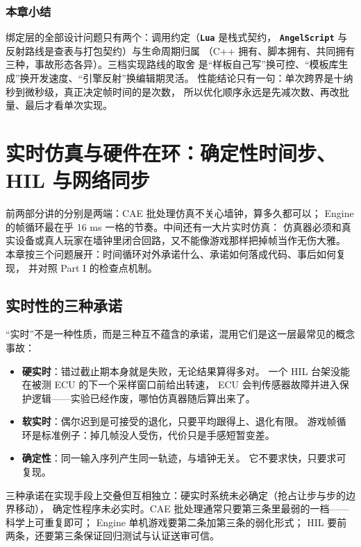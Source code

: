 \documentclass[12pt,a4paper,fontset=fandol]{ctexbook}
\newcommand{\Lib}[1]{\textbf{\texttt{#1}}}
\newcommand{\Lang}[1]{\textsf{#1}}
\newcommand{\DomCAE}{\Lang{CAE}}
\newcommand{\DomEngine}{\Lang{Engine}}
\begin{document}
\subsection*{本章小结}
绑定层的全部设计问题只有两个：调用约定（\Lib{Lua} 是栈式契约，
\Lib{AngelScript} 与反射路线是查表与打包契约）与生命周期归属
（C++ 拥有、脚本拥有、共同拥有三种，事故形态各异）。三档实现路线的取舍
是``样板自己写''换可控、``模板库生成''换开发速度、``引擎反射''换编辑期灵活。
性能结论只有一句：单次跨界是十纳秒到微秒级，真正决定帧时间的是次数，
所以优化顺序永远是先减次数、再改批量、最后才看单次实现。

\chapter{实时仿真与硬件在环：确定性时间步、HIL 与网络同步}
\label{ch:ch15-hil}

前两部分讲的分别是两端：\DomCAE{} 批处理仿真不关心墙钟，算多久都可以；
\DomEngine{} 的帧循环最在乎 16 ms 一格的节奏。中间还有一大片实时仿真：
仿真器必须和真实设备或真人玩家在墙钟里闭合回路，又不能像游戏那样把掉帧当作无伤大雅。
本章按三个问题展开：时间循环对外承诺什么、承诺如何落成代码、事后如何复现，
并对照 Part I 的检查点机制。

\section{实时性的三种承诺}
\label{sec:ch15-promises}

``实时''不是一种性质，而是三种互不蕴含的承诺，混用它们是这一层最常见的概念事故：

\begin{itemize}
  \item \textbf{硬实时}：错过截止期本身就是失败，无论结果算得多对。
        一个 HIL 台架没能在被测 ECU 的下一个采样窗口前给出转速，
        ECU 会判传感器故障并进入保护逻辑——实验已经作废，哪怕仿真器随后算出来了。
  \item \textbf{软实时}：偶尔迟到是可接受的退化，只要平均跟得上、退化有限。
        游戏帧循环是标准例子：掉几帧没人受伤，代价只是手感短暂变差。
  \item \textbf{确定性}：同一输入序列产生同一轨迹，与墙钟无关。
        它不要求快，只要求可复现。
\end{itemize}

三种承诺在实现手段上交叠但互相独立：硬实时系统未必确定（抢占让步与步的边界移动），
确定性程序未必实时。\DomCAE{} 批处理通常只要第三条里最弱的一档——科学上可重复即可；
\DomEngine{} 单机游戏要第二条加第三条的弱化形式；
HIL 要前两条，还要第三条保证回归测试与认证送审可信。
\end{document}

